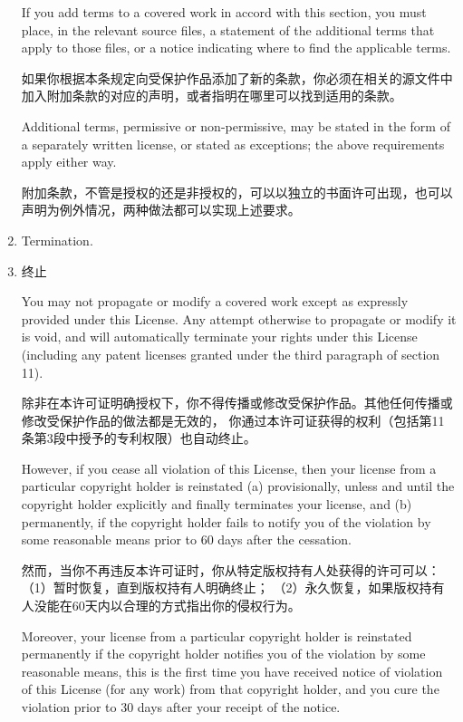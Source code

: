 \documentclass[11pt]{article}
\begin{document}
\begin{enumerate}
        If you add terms to a covered work in accord with this section, you
        must place, in the relevant source files, a statement of the
        additional terms that apply to those files, or a notice indicating
        where to find the applicable terms.

        如果你根据本条规定向受保护作品添加了新的条款，你必须在相关的源文件中加入附加条款的对应的声明，或者指明在哪里可以找到适用的条款。

        Additional terms, permissive or non-permissive, may be stated in the
        form of a separately written license, or stated as exceptions;
        the above requirements apply either way.

        附加条款，不管是授权的还是非授权的，可以以独立的书面许可出现，也可以声明为例外情况，两种做法都可以实现上述要求。

  \item Termination.
  \item 终止

        You may not propagate or modify a covered work except as expressly
        provided under this License.  Any attempt otherwise to propagate or
        modify it is void, and will automatically terminate your rights under
        this License (including any patent licenses granted under the third
        paragraph of section 11).

        除非在本许可证明确授权下，你不得传播或修改受保护作品。其他任何传播或修改受保护作品的做法都是无效的，
        你通过本许可证获得的权利（包括第11条第3段中授予的专利权限）也自动终止。

        However, if you cease all violation of this License, then your
        license from a particular copyright holder is reinstated (a)
        provisionally, unless and until the copyright holder explicitly and
        finally terminates your license, and (b) permanently, if the copyright
        holder fails to notify you of the violation by some reasonable means
        prior to 60 days after the cessation.

        然而，当你不再违反本许可证时，你从特定版权持有人处获得的许可可以：（1）暂时恢复，直到版权持有人明确终止；
        （2）永久恢复，如果版权持有人没能在60天内以合理的方式指出你的侵权行为。

        Moreover, your license from a particular copyright holder is
        reinstated permanently if the copyright holder notifies you of the
        violation by some reasonable means, this is the first time you have
        received notice of violation of this License (for any work) from that
        copyright holder, and you cure the violation prior to 30 days after
        your receipt of the notice.


\end{enumerate}
\end{document}
